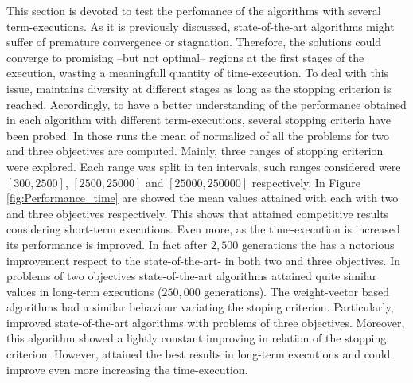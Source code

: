 This section is devoted to test the perfomance of the algorithms with several term-executions.
%
As it is previously discussed, state-of-the-art algorithms might suffer of premature convergence or stagnation.
%
Therefore, the solutions could converge to promising --but not optimal-- regions at the first stages of the execution, wasting a meaningfull quantity of time-execution.
%
To deal with this issue, \VSDMOEA{} maintains diversity at different stages as long as the stopping criterion is reached.
%
Accordingly, to have a better understanding of the performance obtained in each algorithm with different term-executions, several stopping criteria have been probed.
%
In those runs the mean of normalized \HV{} of all the problems for two and three objectives are computed.
%
Mainly, three ranges of stopping criterion were explored.
%
Each range was split in ten intervals, such ranges considered were $[300, 2500]$, $[2500, 25000]$ and $[25000, 250000]$ respectively.
%
In Figure \ref{fig:Performance_time} are showed the mean \HV{} values attained with each \MOEA{} with two and three objectives respectively.
%
This shows that \VSDMOEA{} attained competitive results considering short-term executions.
%
Even more, as the time-execution is increased its performance is improved.
%
In fact after $2,500$ generations the \VSDMOEA{} has a notorious improvement respect to the state-of-the-art-\MOEAS{} in both two and three objectives.
%
In problems of two objectives state-of-the-art algorithms attained quite similar \HV{} values in long-term executions ($250,000$ generations).
%
The weight-vector based algorithms had a similar behaviour variating the stoping criterion.
%
Particularly, \RMOEA{} improved state-of-the-art algorithms with problems of three objectives.
%
Moreover, this algorithm showed a lightly constant improving in relation of the stopping criterion.
%
However, \VSDMOEA{} attained the best results in long-term executions and could improve even more increasing the time-execution.
%


